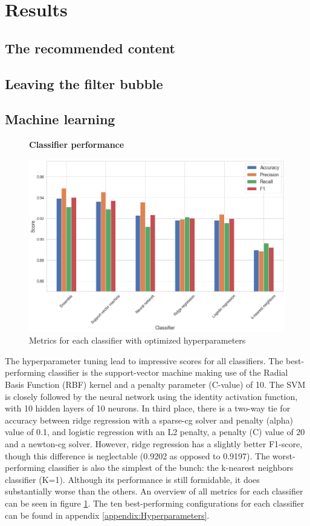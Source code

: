 \documentclass[../main.tex]{subfiles}
\begin{document}
\section{Results}

\subsection{The recommended content}

\subsection{Leaving the filter bubble}

\subsection{Machine learning}

\begin{figure}[t!]
  \textbf{Classifier performance}\par\medskip
  \centering
  \includegraphics[keepaspectratio, width=\textwidth]{images/classifier_results.png}
  \caption{Metrics for each classifier with optimized hyperparameters}
  \label{fig:ML_scores}
\end{figure}

The hyperparameter tuning lead to impressive scores for all classifiers. The best-performing classifier is the support-vector machine making use of the Radial Basis Function (RBF) kernel and a penalty parameter (C-value) of 10. The SVM is closely followed by the neural network using the identity activation function, with 10 hidden layers of 10 neurons. In third place, there is a two-way tie for accuracy between ridge regression with a sparse-cg solver and penalty (alpha) value of 0.1, and logistic regression with an L2 penalty, a penalty (C) value of 20 and a newton-cg solver. However, ridge regression has a slightly better F1-score, though this difference is neglectable (0.9202 as opposed to 0.9197). The worst-performing classifier is also the simplest of the bunch: the k-nearest neighbors classifier (K=1). Although its performance is still formidable, it does substantially worse than the others. An overview of all metrics for each classifier can be seen in figure \ref{fig:ML_scores}. The ten best-performing configurations for each classifier can be found in appendix \ref{appendix:Hyperparameters}.
\end{document}
